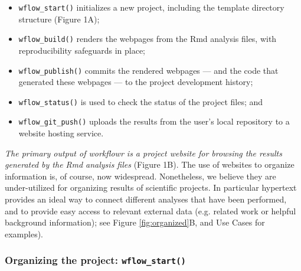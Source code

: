 \documentclass[9pt,a4paper]{extarticle}
\begin{document}
\begin{itemize}

\item \texttt{wflow\_start()} initializes a new project, including the template
directory structure (Figure 1A);

\item \texttt{wflow\_build()} renders the webpages from the Rmd analysis files,
with reproducibility safeguards in place;

\item \texttt{wflow\_publish()} commits the rendered webpages --- and the code
that generated these webpages --- to the project development history;

\item \texttt{wflow\_status()} is used to check the status of the project files;
and

\item \texttt{wflow\_git\_push()} uploads the results from the user's local
repository to a website hosting service.

\end{itemize}

\textit{The primary output of workflowr is a project website for
browsing the results generated by the Rmd analysis files} (Figure 1B).
The use of websites to organize information is, of course, now
widespread. Nonetheless, we believe they are under-utilized for
organizing results of scientific projects. In particular hypertext
provides an ideal way to connect different analyses that have been
performed, and to provide easy access to relevant external data (e.g.
related work or helpful background information); see Figure \ref{fig:organized}B, and Use
Cases for examples).

\subsubsection*{Organizing the project: \texttt{wflow\_start()}}
\end{document}
